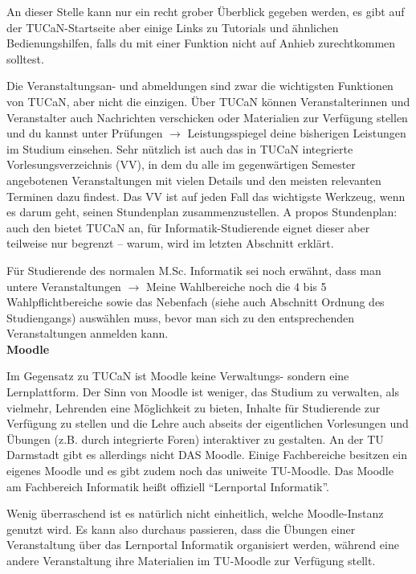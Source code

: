 {    An dieser Stelle kann nur ein recht grober Überblick gegeben werden, es gibt auf der TUCaN-Startseite aber einige Links zu Tutorials und ähnlichen Bedienungshilfen, falls du mit einer Funktion nicht auf Anhieb zurechtkommen solltest.

    Die Veranstaltungsan- und abmeldungen sind zwar die wichtigsten Funktionen von TUCaN, aber nicht die einzigen. Über TUCaN können Veranstalterinnen und Veranstalter auch Nachrichten verschicken oder Materialien zur Verfügung stellen und du kannst unter Prüfungen $\rightarrow$ Leistungsspiegel deine bisherigen Leistungen im Studium einsehen. Sehr nützlich ist auch das in TUCaN integrierte Vorlesungsverzeichnis (VV), in dem du alle im gegenwärtigen Semester angebotenen Veranstaltungen mit vielen Details und den meisten relevanten Terminen dazu findest. Das VV ist auf jeden Fall das wichtigste Werkzeug, wenn es darum geht, seinen Stundenplan zusammenzustellen. A propos Stundenplan: auch den bietet TUCaN an, für Informatik-Studierende eignet dieser aber teilweise nur begrenzt – warum, wird im letzten Abschnitt erklärt.

    Für Studierende des normalen M.Sc. Informatik sei noch erwähnt, dass man untere Veranstaltungen $\rightarrow$ Meine Wahlbereiche noch die 4 bis 5 Wahlpflichtbereiche sowie das Nebenfach (siehe auch Abschnitt Ordnung des Studiengangs) auswählen muss, bevor man sich zu den entsprechenden Veranstaltungen anmelden kann.\\

    \noindent\textbf{Moodle}

    Im Gegensatz zu TUCaN ist Moodle keine Verwaltungs- sondern eine Lernplattform. Der Sinn von Moodle ist weniger, das Studium zu verwalten, als vielmehr, Lehrenden eine Möglichkeit zu bieten, Inhalte für Studierende zur Verfügung zu stellen und die Lehre auch abseits der eigentlichen Vorlesungen und Übungen (z.B. durch integrierte Foren) interaktiver zu gestalten. An der TU Darmstadt gibt es allerdings nicht DAS Moodle. Einige Fachbereiche besitzen ein eigenes Moodle und es gibt zudem noch das uniweite TU-Moodle. Das Moodle am Fachbereich Informatik \footnotemark[2] heißt offiziell "`Lernportal Informatik"'.

    Wenig überraschend ist es natürlich nicht einheitlich, welche Moodle-Instanz genutzt wird. Es kann also durchaus passieren, dass die Übungen einer Veranstaltung über das Lernportal Informatik organisiert werden, während eine andere Veranstaltung ihre Materialien im TU-Moodle \footnotemark[3] zur Verfügung stellt.

}
